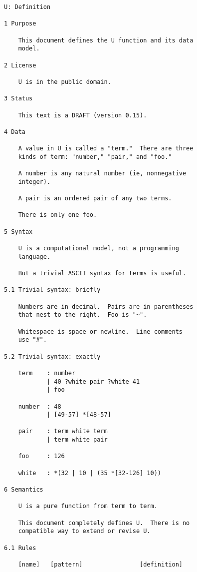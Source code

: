\documentclass[twoside]{article}
\begin{document}
\begin{lstlisting}[label=lst:u,caption={U: Definition.  The earliest extant Nock.  Only layout has been changed for print.},style=listingcode]
U: Definition

1 Purpose

    This document defines the U function and its data
    model.

2 License

    U is in the public domain.

3 Status

    This text is a DRAFT (version 0.15).

4 Data

    A value in U is called a "term."  There are three
    kinds of term: "number," "pair," and "foo."

    A number is any natural number (ie, nonnegative
    integer).

    A pair is an ordered pair of any two terms.

    There is only one foo.

5 Syntax

    U is a computational model, not a programming
    language.

    But a trivial ASCII syntax for terms is useful.

5.1 Trivial syntax: briefly

    Numbers are in decimal.  Pairs are in parentheses
    that nest to the right.  Foo is "~".

    Whitespace is space or newline.  Line comments
    use "#".

5.2 Trivial syntax: exactly

    term    : number
            | 40 ?white pair ?white 41
            | foo

    number  : 48
            | [49-57] *[48-57]

    pair    : term white term
            | term white pair

    foo     : 126

    white   : *(32 | 10 | (35 *[32-126] 10))

6 Semantics

    U is a pure function from term to term.

    This document completely defines U.  There is no
    compatible way to extend or revise U.

6.1 Rules

    [name]   [pattern]                [definition]


\end{lstlisting}
\end{document}
